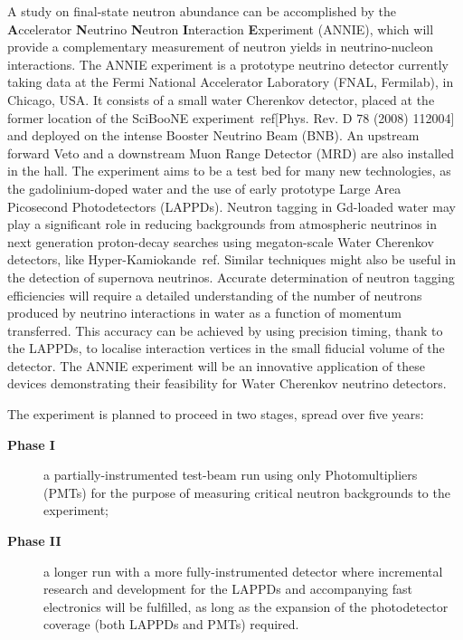  A study on final-state neutron abundance can be accomplished by the %
 \textbf{A}ccelerator \textbf{N}eutrino \textbf{N}eutron \textbf{I}nteraction \textbf{E}xperiment %
 (ANNIE), which will provide a complementary measurement of neutron yields in %
 neutrino-nucleon interactions.
 The ANNIE experiment is a prototype neutrino detector currently taking data at the %
 Fermi National Accelerator Laboratory (FNAL, Fermilab), in Chicago, USA.
 It consists of a small water Cherenkov detector, placed at the former location of %
 the SciBooNE experiment~ref[Phys. Rev. D 78 (2008) 112004] and %
 deployed on the intense Booster Neutrino Beam (BNB).
 An upstream forward Veto and a downstream Muon Range Detector (MRD) are also installed %
 in the hall.
 The experiment aims to be a test bed for many new technologies, as the gadolinium-doped water %
 and the use of early prototype Large Area Picosecond Photodetectors (LAPPDs).
 Neutron tagging in Gd-loaded water may play a significant role
 in reducing backgrounds from atmospheric neutrinos in next generation 
 proton-decay searches using megaton-scale Water Cherenkov detectors, like Hyper-Kamiokande~ref.
 Similar techniques might also be useful in the detection of supernova neutrinos. 
 Accurate determination of neutron tagging efficiencies will require a 
 detailed understanding of the number of neutrons produced by neutrino interactions 
 in water as a function of momentum transferred.
 This accuracy can be achieved by using precision timing, thank to the LAPPDs, to localise %
 interaction vertices in the small fiducial volume of the detector.
 The ANNIE experiment will be an innovative application of these devices demonstrating %
 their feasibility for Water Cherenkov neutrino detectors.
 
 The experiment is planned to proceed in two stages, spread over five years:
 \begin{description}
   \item[\bfseries Phase I] a partially-instrumented test-beam run using only Photomultipliers %
     (PMTs) for the purpose of measuring critical neutron backgrounds to the experiment;
   \item[\bfseries Phase II] a longer run with a more fully-instrumented detector %
     where incremental research and development for the LAPPDs and %
     accompanying fast electronics will be fulfilled, as long as the expansion of the %
     photodetector coverage (both LAPPDs and PMTs) required.
 \end{description}

